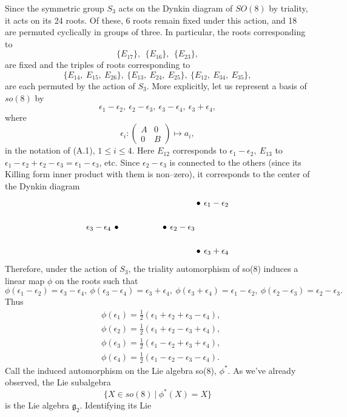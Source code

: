 \documentclass[12pt,letterpaper]{amsart}
\newcommand{\eps}{\epsilon}
\begin{document}
Since the symmetric group $S_3$ acts on the Dynkin diagram of $SO(8)$
by triality,
it acts on its 24 roots. Of these, 6 roots remain fixed under
this action, and 18 are permuted cyclically in groups of three. In
particular, the roots corresponding to
\[
\{E_{17}\},\ \ \{E_{16}\},\ \ \{E_{23}\},
\]
are fixed and the triples of roots corresponding to
\[
\{E_{14},\ E_{15},\ E_{26}\},\ \{E_{13},\ E_{24},\ E_{25}\},
\ \{E_{12},\ E_{34},\ E_{35}\},
\]
are each permuted by the action of $S_3$. More explicitly, let us
represent a basis of $so(8)$ by
\[
\eps_1 - \eps_2,\  \eps_2 - \eps_3,\ \eps_3 - \eps_4,\ \eps_3 + \eps_4,
\]
where
\[
\eps_i : \begin{pmatrix} A&0\\0&B\end{pmatrix}
\longmapsto a_i, \tag{A.10}
\]
in the notation of (A.1), $1 \leq i \leq 4$.
Here $E_{12}$ corresponds to $\eps_1 - \eps_2,\ E_{13}$ to
$\eps_1 - \eps_2 + \eps_2 - \eps_3 = \eps_1 - \eps_3$, etc. Since
$\eps_2 - \eps_3$ is connected to the others (since its Killing form inner
product with them is non--zero), it corresponds to the center of the
Dynkin diagram
\[
\begin{tikzpicture}[baseline=(c.base)]
\node (c) at (0,0) {$\bullet$};
\node[right] at (0.1,0) {$\eps_2-\eps_3$};
\node at (-2.0,0) {$\bullet$};
\node[left] at (-2.1,0) {$\eps_3-\eps_4$};
\node at (1.4,1.0) {$\bullet$};
\node[right] at (1.5,1.0) {$\eps_1-\eps_2$};
\node at (1.4,-1.0) {$\bullet$};
\node[right] at (1.5,-1.0) {$\eps_3+\eps_4$};
\end{tikzpicture}
\]
Therefore, under the action of $S_3$, the triality automorphism of
so(8) induces a linear map $\phi$ on the roots such that
\[
\phi (\eps_1 - \eps_2) = \eps_3 - \eps_4,
\ \phi (\eps_3 - \eps_4) = \eps_3 + \eps_4,
\ \phi (\eps_3 + \eps_4) = \eps_1 - \eps_2,
\ \phi (\eps_2 - \eps_3) = \eps_2 - \eps_3.\tag{A.11}
\]
Thus
\[
\begin{split}
&\phi (\eps_1) = \frac{1}{{2}}(\eps_1 + \eps_2 + \eps_3 - \eps_4),\\
&\phi (\eps_2) = \frac{1}{{2}}(\eps_1 + \eps_2 - \eps_3 + \eps_4),\\
&\phi (\eps_3) = \frac{1}{{2}}(\eps_1 - \eps_2 + \eps_3 + \eps_4),\\
&\phi (\eps_4) = \frac{1}{{2}}(\eps_1 - \eps_2 - \eps_3 - \eps_4).
\end{split}
\]
Call the induced automorphism on the Lie algebra so(8), $\phi^*$. As
we've already observed, the Lie subalgebra
\[
\{X \in so(8)\ |\ \phi^*(X) = X\}
\]
is the Lie algebra ${\mathfrak g}_2$. Identifying its Lie
\end{document}
